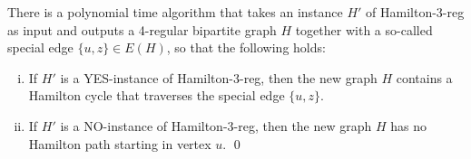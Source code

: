 \documentclass[runningheads]{llncs}
\newcommand{\xxxHAM}{{\sc Hamilton-3-reg}}
\begin{document}
\begin{lemma}
\label{le:Ham-to-Ham}
There is a polynomial time algorithm that takes an instance $H'$ of {\xxxHAM} as input and outputs 
a 4-regular bipartite graph $H$ together with a so-called special edge $\{u,z\}\in E(H)$,
so that the following holds:
\begin{enumerate}[(i)]
\item If $H'$ is a YES-instance of {\xxxHAM}, then the new graph $H$ contains a Hamilton cycle 
that traverses the special edge $\{u,z\}$.
\item If $H'$ is a NO-instance of {\xxxHAM}, then the new graph $H$ has no Hamilton path
starting in vertex $u$. 
\qed
\end{enumerate}
\end{lemma}
\end{document}
